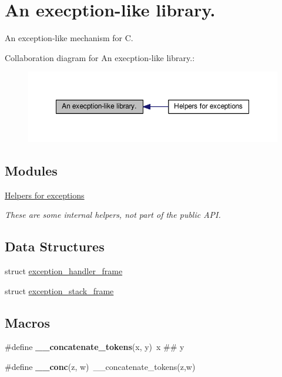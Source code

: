 \hypertarget{group__exceptions}{\section{An execption-\/like library.}
\label{group__exceptions}
}


An exception-\/like mechanism for C.  


Collaboration diagram for An execption-\/like library.\-:
\nopagebreak
\begin{figure}[H]
\begin{center}
\leavevmode
\includegraphics[width=350pt]{group__exceptions}
\end{center}
\end{figure}
\subsection*{Modules}
\begin{DoxyCompactItemize}
\item 
\hyperlink{group__helpers}{Helpers for exceptions}
\begin{DoxyCompactList}\small\item\em These are some internal helpers, not part of the public A\-P\-I. \end{DoxyCompactList}\end{DoxyCompactItemize}
\subsection*{Data Structures}
\begin{DoxyCompactItemize}
\item 
struct \hyperlink{structexception__handler__frame}{exception\-\_\-handler\-\_\-frame}
\item 
struct \hyperlink{structexception__stack__frame}{exception\-\_\-stack\-\_\-frame}
\end{DoxyCompactItemize}
\subsection*{Macros}
\begin{DoxyCompactItemize}
\item 
\hypertarget{group__exceptions_gadf8cc03bd0ede7f3e5aafa57de5016dd}{\#define {\bfseries \-\_\-\-\_\-concatenate\-\_\-tokens}(x, y)~x \#\# y}\label{group__exceptions_gadf8cc03bd0ede7f3e5aafa57de5016dd}

\item 
\hypertarget{group__exceptions_ga0d2e02c74b05d3ff3bfa9eb3dcd891e3}{\#define {\bfseries \-\_\-\-\_\-conc}(z, w)~\-\_\-\-\_\-concatenate\-\_\-tokens(z,w)}\label{group__exceptions_ga0d2e02c74b05d3ff3bfa9eb3dcd891e3}

\end{DoxyCompactItemize}
